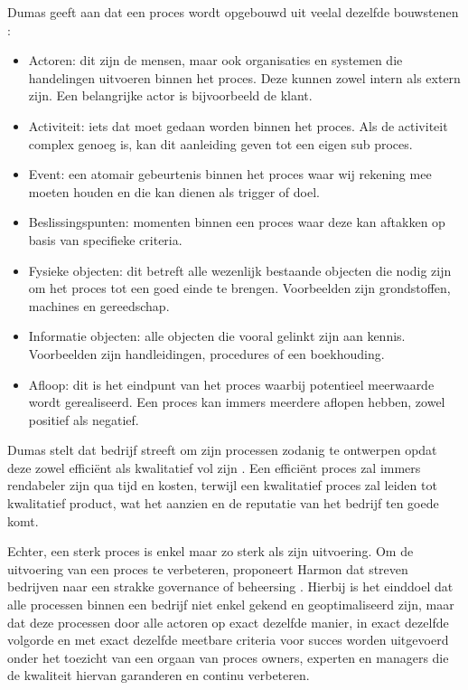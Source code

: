 Dumas geeft aan dat een proces wordt opgebouwd uit veelal dezelfde bouwstenen \autocite[pp. 3-4]{Dumas2018}: 
\begin{itemize}
  \item Actoren: dit zijn de mensen, maar ook organisaties en systemen die handelingen uitvoeren binnen het proces. Deze kunnen zowel intern als extern zijn. Een belangrijke actor is bijvoorbeeld de klant.
  \item Activiteit: iets dat moet gedaan worden binnen het proces. Als de activiteit complex genoeg is, kan dit aanleiding geven tot een eigen sub proces. 
  \item Event: een atomair gebeurtenis binnen het proces waar wij rekening mee moeten houden en die kan dienen als trigger of doel.
  \item Beslissingspunten: momenten binnen een proces waar deze kan aftakken op basis van specifieke criteria.
  \item Fysieke objecten: dit betreft alle wezenlijk bestaande objecten die nodig zijn om het proces tot een goed einde te brengen. Voorbeelden zijn grondstoffen, machines en gereedschap.
  \item Informatie objecten: alle objecten die vooral gelinkt zijn aan kennis. Voorbeelden zijn handleidingen, procedures of een boekhouding.
  \item Afloop: dit is het eindpunt van het proces waarbij potentieel meerwaarde wordt gerealiseerd. Een proces kan immers meerdere aflopen hebben, zowel positief als negatief.
\end{itemize}

Dumas stelt dat bedrijf streeft om zijn processen zodanig te ontwerpen opdat deze zowel efficiënt als kwalitatief vol zijn \autocite[p. 2]{Dumas2018}. Een efficiënt proces zal immers rendabeler zijn qua tijd en kosten, terwijl een kwalitatief proces zal leiden tot kwalitatief product, wat het aanzien en de reputatie van het bedrijf ten goede komt. \newline

Echter, een sterk proces is enkel maar zo sterk als zijn uitvoering. Om de uitvoering van een proces te verbeteren, proponeert Harmon dat streven bedrijven naar een strakke governance of beheersing \autocite[p. 79]{Harmon2014}. Hierbij is het einddoel dat alle processen binnen een bedrijf niet enkel gekend en geoptimaliseerd zijn, maar dat deze processen door alle actoren op exact dezelfde manier, in exact dezelfde volgorde en met exact dezelfde meetbare criteria voor succes worden uitgevoerd onder het toezicht van een orgaan van proces owners, experten en managers die de kwaliteit hiervan garanderen en continu verbeteren. \newline

